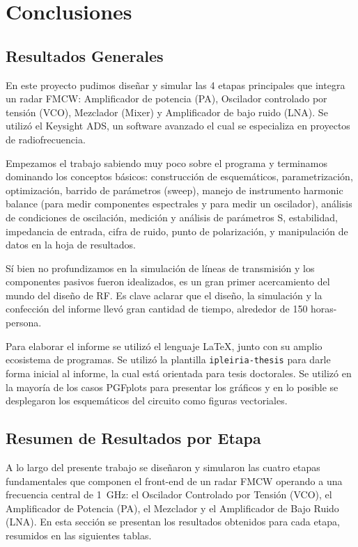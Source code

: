 \chapter{Conclusiones}
\label{chap:conclusiones}

\section{Resultados Generales}

En este proyecto pudimos diseñar y simular las 4 etapas principales que integra un radar FMCW: Amplificador de potencia (PA), Oscilador controlado por tensión (VCO), Mezclador (Mixer) y Amplificador de bajo ruido (LNA). Se utilizó el Keysight ADS, un software avanzado el cual se especializa en proyectos de radiofrecuencia.

Empezamos el trabajo sabiendo muy poco sobre el programa y terminamos dominando los conceptos básicos: construcción de esquemáticos, parametrización, optimización, barrido de parámetros (sweep), manejo de instrumento harmonic balance (para medir componentes espectrales y para medir un oscilador), análisis de condiciones de oscilación, medición y análisis de parámetros S, estabilidad, impedancia de entrada, cifra de ruido, punto de polarización, y manipulación de datos en la hoja de resultados.

Sí bien no profundizamos en la simulación de líneas de transmisión y los componentes pasivos fueron idealizados, es un gran primer acercamiento del mundo del diseño de RF. Es clave aclarar que el diseño, la simulación y la confección del informe llevó gran cantidad de tiempo, alrededor de 150 horas-persona.

Para elaborar el informe se utilizó el lenguaje \LaTeX{}, junto con su amplio ecosistema de programas. Se utilizó la plantilla \texttt{ipleiria-thesis} para darle forma inicial al informe, la cual está orientada para tesis doctorales. Se utilizó en la mayoría de los casos PGFplots para presentar los gráficos y en lo posible se desplegaron los esquemáticos del circuito como figuras vectoriales.

\section{Resumen de Resultados por Etapa}

A lo largo del presente trabajo se diseñaron y simularon las cuatro etapas fundamentales que componen el front-end de un radar FMCW operando a una frecuencia central de \qty{1}{\GHz}: el Oscilador Controlado por Tensión (VCO), el Amplificador de Potencia (PA), el Mezclador y el Amplificador de Bajo Ruido (LNA). En esta sección se presentan los resultados obtenidos para cada etapa, resumidos en las siguientes tablas.

